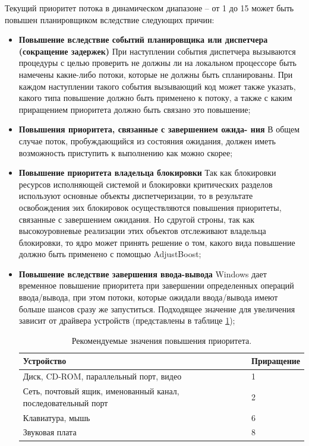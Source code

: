 \documentclass[a4paper,14pt,russian]{extreport}
\begin{document}
	Текущий приоритет потока в динамическом диапазоне – от 1 до 15 может быть повышен планировщиком вследствие следующих причин:
	\begin{itemize}
		\item \textbf{Повышение вследствие событий планировщика или диспетчера (сокращение задержек)}
		При наступлении события диспетчера вызываются процедуры с целью проверить не должны ли на локальном процессоре быть намечены какие-либо потоки, которые не должны быть спланированы.
		При каждом наступлении такого события вызывающий код может также указать, какого типа повышение должно быть применено к потоку, а также с каким приращением приоритета должно быть связано это		повышение;
	
		\item \textbf{Повышения приоритета, связанные с завершением ожида-
		ния}
		В общем случае поток, пробуждающийся из состояния ожидания, должен иметь возможность приступить к выполнению как можно скорее;
		
		\item \textbf{Повышение приоритета владельца блокировки}
		Так как блокировки ресурсов исполняющей системой и блокировки критических разделов используют основные объекты диспетчеризации, то в результате освобождения эих блокировок осуществляются		повышения приоритеты, связанные с завершением ожидания.
		Но сдругой строны, так как высокоуровневые реализации этих объектов отслеживают владельца блокировки, то ядро может принять решение о том, какого вида повышение должно быть применено с помощью AdjustBoost;
		
		\item \textbf{Повышение вследствие завершения ввода-вывода}
		Windows дает временное повышение приоритета при завершении определенных операций ввода/вывода, при этом потоки, которые ожидали ввода/вывода имеют больше шансов сразу же запуститься.
		Подходящее значение для увеличения зависит от драйвера устройств (представлены в таблице \ref{tab:io});
		\begin{table}[h!]
			\caption{Рекомендуемые значения повышения приоритета.}
			\begin{center}
				\begin{tabular}{|p{100mm}|l|}
					\hline
					\textbf{Устройство} & \textbf{Приращение} \\
					\hline
					Диск, CD-ROM, параллельный порт, видео & 1 \\
					\hline
					Сеть, почтовый ящик, именованный канал, последовательный порт & 2 \\
					\hline
					Клавиатура, мышь & 6 \\
					\hline
					Звуковая плата & 8 \\
					\hline
				\end{tabular}
			\end{center}
			\label{tab:io}
		\end{table}
		

\end{itemize}
\end{document}
